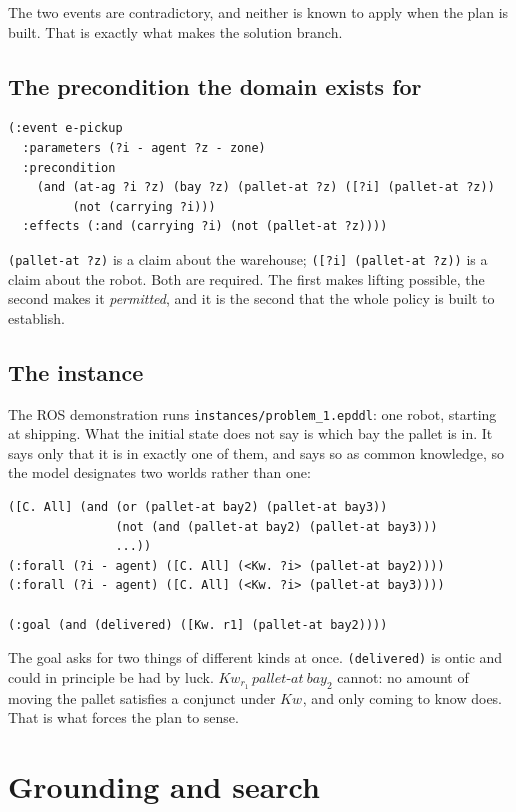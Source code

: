 \documentclass[11pt,a4paper]{article}
\theoremstyle{definition}
\newcommand{\Kw}[1]{\mathit{Kw}_{#1}}
\newcommand{\code}[1]{\texttt{\small #1}}
\begin{document}
The two events are contradictory, and neither is known to apply when the plan
is built. That is exactly what makes the solution branch.

\subsection{The precondition the domain exists for}

\begin{lstlisting}
(:event e-pickup
  :parameters (?i - agent ?z - zone)
  :precondition
    (and (at-ag ?i ?z) (bay ?z) (pallet-at ?z) ([?i] (pallet-at ?z))
         (not (carrying ?i)))
  :effects (:and (carrying ?i) (not (pallet-at ?z))))
\end{lstlisting}

\code{(pallet-at ?z)} is a claim about the warehouse; \code{([?i] (pallet-at
?z))} is a claim about the robot. Both are required. The first makes lifting
possible, the second makes it \emph{permitted}, and it is the second that the
whole policy is built to establish.

\subsection{The instance}

The ROS demonstration runs \code{instances/problem\_1.epddl}: one robot,
starting at shipping. What the initial state does not say is which bay the
pallet is in. It says only that it is in exactly one of them, and says so as
common knowledge, so the model designates two worlds rather than one:

\begin{lstlisting}
([C. All] (and (or (pallet-at bay2) (pallet-at bay3))
               (not (and (pallet-at bay2) (pallet-at bay3)))
               ...))
(:forall (?i - agent) ([C. All] (<Kw. ?i> (pallet-at bay2))))
(:forall (?i - agent) ([C. All] (<Kw. ?i> (pallet-at bay3))))

(:goal (and (delivered) ([Kw. r1] (pallet-at bay2))))
\end{lstlisting}

The goal asks for two things of different kinds at once. \code{(delivered)} is
ontic and could in principle be had by luck. $\Kw{r_1}\,\mathit{pallet\text{-}at\
bay_2}$ cannot: no amount of moving the pallet satisfies a conjunct under
$\Kw{}$, and only coming to know does. That is what forces the plan to sense.

\section{Grounding and search}
\end{document}
